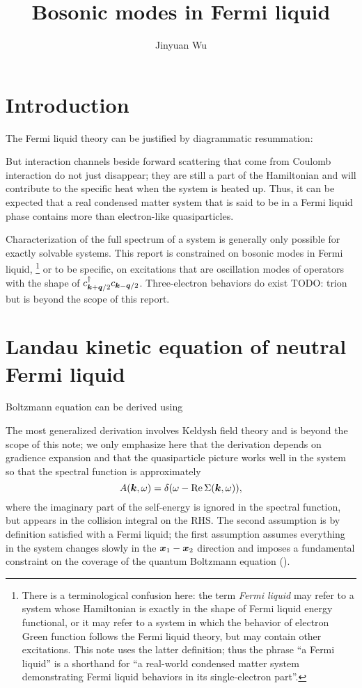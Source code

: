 \documentclass[hyperref, a4paper]{article}
\title{Bosonic modes in Fermi liquid}
\author{Jinyuan Wu}
\newcommand*{\term}[1]{\textit{#1}}
\begin{document}
\maketitle

\section{Introduction}

The Fermi liquid theory can be justified by diagrammatic resummation: 

But interaction channels beside forward scattering 
that come from Coulomb interaction do not just disappear;
they are still a part of the Hamiltonian
and will contribute to the specific heat 
when the system is heated up.
Thus, it can be expected that a real condensed matter system 
that is said to be in a Fermi liquid phase 
contains more than electron-like quasiparticles. 

Characterization of the full spectrum of a system is 
generally only possible for exactly solvable systems. 
This report is constrained on bosonic modes in Fermi liquid,%
\footnote{
    There is a terminological confusion here: 
    the term \term{Fermi liquid} may refer to 
    a system whose Hamiltonian is exactly in the shape of 
    Fermi liquid energy functional,
    or it may refer to a system 
    in which the behavior of electron Green function 
    follows the Fermi liquid theory, 
    but may contain other excitations.
    This note uses the latter definition;
    thus the phrase ``a Fermi liquid'' 
    is a shorthand for ``a real-world condensed matter system 
    demonstrating Fermi liquid behaviors in its single-electron part''.
}
or to be specific, on excitations that are oscillation modes of 
operators with the shape of $c^\dagger_{\vb*{k} + \vb*{q} / 2} c_{\vb*{k} - \vb*{q} / 2}$.
Three-electron behaviors do exist TODO: trion 
but is beyond the scope of this report.

\section{Landau kinetic equation of neutral Fermi liquid}


Boltzmann equation can be derived using 

The most generalized derivation involves Keldysh field theory 
and is beyond the scope of this note; 
we only emphasize here that the derivation 
depends on gradience expansion 
and that the quasiparticle picture works well in the system 
so that the spectral function is approximately 
\begin{equation}
    A(\vb*{k}, \omega) = \delta(\omega - \Re \Sigma(\vb*{k}, \omega)),
\end{equation}
where the imaginary part of the self-energy is ignored 
in the spectral function,
but appears in the collision integral on the RHS.
The second assumption is by definition satisfied with a Fermi liquid;
the first assumption assumes everything in the system changes slowly 
in the $\vb*{x}_1 - \vb*{x}_2$ direction 
and imposes a fundamental constraint 
on the coverage of the quantum Boltzmann equation
(). 
\end{document}
